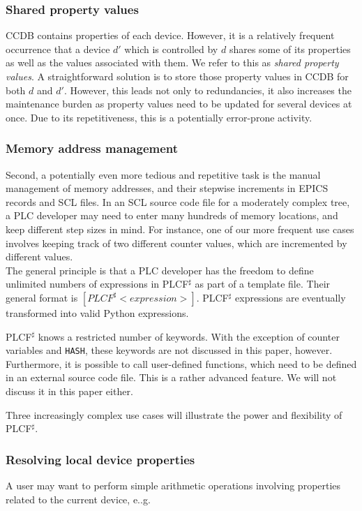 \documentclass[a4paper,
              ]{jacow}
\begin{document}
\subsubsection{Shared property values}
CCDB contains properties of each device. However, it is a relatively frequent occurrence that a device $d'$ which is controlled by $d$ shares some of its properties as well as the values associated with them. We refer to this as \emph{shared property values}. A straightforward solution is to store those property values in CCDB for both $d$ and $d'$. However, this leads not only to redundancies, it also increases the maintenance burden as property values need to be updated for several devices at once. Due to its repetitiveness, this is a potentially error-prone activity.

\subsubsection{Memory address management}
Second, a potentially even more tedious and repetitive task is the manual management of memory addresses, and their stepwise increments in EPICS records and SCL files. In an SCL source code file for a moderately complex tree, a PLC developer may need to enter many hundreds of memory locations, and keep different step sizes in mind. For instance, one of our more frequent use cases involves keeping track of two different counter values, which are incremented by different values. \\

The general principle is that a PLC developer has the freedom to define unlimited numbers of expressions in PLCF$^\sharp$ as part of a template file. Their general format is $[\mathit{PLCF^\sharp} <\mathit{expression}>]$. PLCF$^\sharp$ expressions are eventually transformed into valid Python expressions.

PLCF$^\sharp$ knows a  restricted number of keywords. With the exception of counter variables and \texttt{HASH}, these keywords are not discussed in this paper, however. Furthermore, it is possible to call user-defined functions, which need to be defined in an external source code file. This is a rather advanced feature. We will not discuss it in this paper either.

Three increasingly complex use cases will illustrate the power and flexibility of PLCF$^\sharp$.  

\subsubsection{Resolving local device properties}
A user may want to perform simple arithmetic operations involving properties related to the current device, e..g.\ \\
\end{document}
